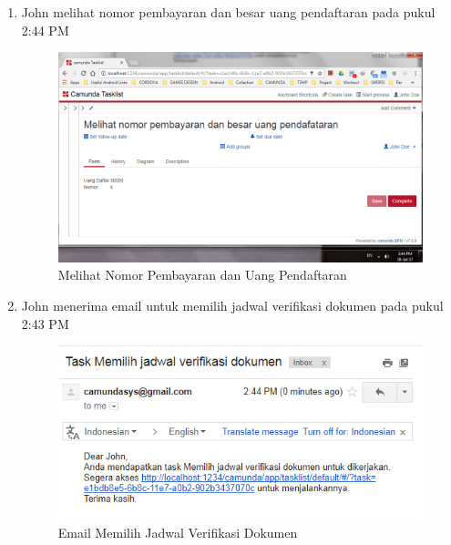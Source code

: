 \begin{enumerate}
	\item John melihat nomor pembayaran dan besar uang pendaftaran pada pukul 2:44 PM
			\begin{figure}[H]
			\centering
			\includegraphics[scale=0.5]{Gambar/Bab-5/kasus2/7}
			\caption{Melihat Nomor Pembayaran dan Uang Pendaftaran} 
			\label{fig:pengujian_kasus2_7}
	\end{figure}
	

	\item John menerima email untuk memilih jadwal verifikasi dokumen pada pukul 2:43 PM
			\begin{figure}[H]
			\centering
			\includegraphics[scale=0.8]{Gambar/Bab-5/kasus2/8}
			\caption{Email Memilih Jadwal Verifikasi Dokumen} 
			\label{fig:pengujian_kasus2_8}
	\end{figure}
	


\end{enumerate}
